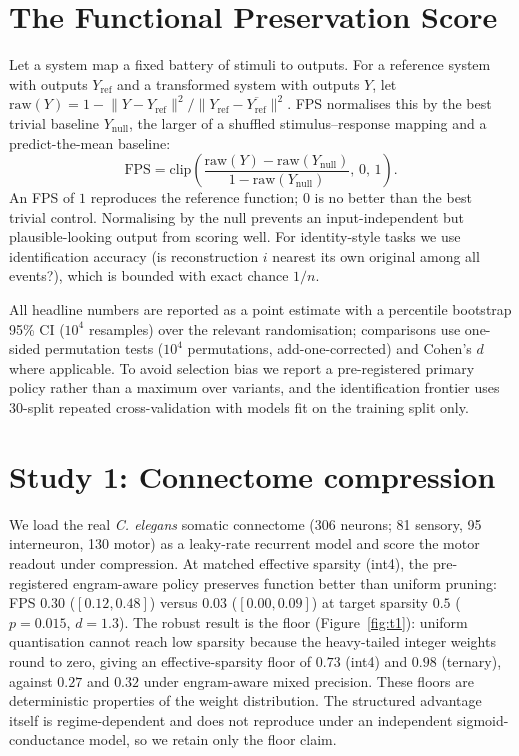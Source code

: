 \documentclass[10pt]{article}
\begin{document}
\section{The Functional Preservation Score}\label{sec:fps}
Let a system map a fixed battery of stimuli to outputs. For a reference system with outputs
$Y_{\mathrm{ref}}$ and a transformed system with outputs $Y$, let
$\mathrm{raw}(Y)=1-\lVert Y-Y_{\mathrm{ref}}\rVert^2/\lVert Y_{\mathrm{ref}}-\overline{Y_{\mathrm{ref}}}\rVert^2$.
FPS normalises this by the best trivial baseline $Y_{\mathrm{null}}$, the larger of a shuffled
stimulus--response mapping and a predict-the-mean baseline:
\begin{equation}
\mathrm{FPS} = \mathrm{clip}\!\left(\frac{\mathrm{raw}(Y)-\mathrm{raw}(Y_{\mathrm{null}})}{1-\mathrm{raw}(Y_{\mathrm{null}})},\,0,\,1\right).
\end{equation}
An FPS of $1$ reproduces the reference function; $0$ is no better than the best trivial control.
Normalising by the null prevents an input-independent but plausible-looking output from scoring
well. For identity-style tasks we use identification accuracy (is reconstruction $i$ nearest its
own original among all events?), which is bounded with exact chance $1/n$.

All headline numbers are reported as a point estimate with a percentile bootstrap 95\% CI
($10^4$ resamples) over the relevant randomisation; comparisons use one-sided permutation tests
($10^4$ permutations, add-one-corrected) and Cohen's $d$ where applicable. To avoid selection
bias we report a pre-registered primary policy rather than a maximum over variants, and the
identification frontier uses 30-split repeated cross-validation with models fit on the training
split only.

\section{Study 1: Connectome compression}\label{sec:t1}
We load the real \emph{C. elegans} somatic connectome
\citep{white1986structure,cook2019connectome} (306 neurons; 81 sensory, 95 interneuron, 130 motor)
as a leaky-rate recurrent model and score the motor readout under compression. At matched effective
sparsity (int4), the pre-registered engram-aware policy preserves function better than uniform
pruning: FPS $0.30$ ($[0.12,0.48]$) versus $0.03$ ($[0.00,0.09]$) at target sparsity $0.5$
($p=0.015$, $d=1.3$). The robust result is the floor (Figure~\ref{fig:t1}): uniform quantisation
cannot reach low sparsity because the heavy-tailed integer weights round to zero, giving an
effective-sparsity floor of $0.73$ (int4) and $0.98$ (ternary), against $0.27$ and $0.32$ under
engram-aware mixed precision. These floors are deterministic properties of the weight
distribution. The structured advantage itself is regime-dependent and does not reproduce under an
independent sigmoid-conductance model, so we retain only the floor claim.
\end{document}
